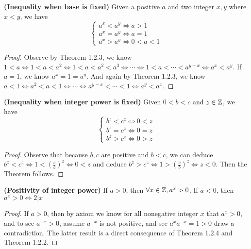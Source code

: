 \documentclass{report}
\begin{document}
\begin{theorem}
\textbf{(Inequality when base is fixed)} Given a positive $a$ and two integer  $x,y$ where  $x<y$, we have
\begin{equation}
\begin{cases}
  a^x<a^y\iff a>1\\
  a^x=a^y \iff a=1 \\
  a^x>a^y \iff 0<a<1  
\end{cases}
\end{equation}
\end{theorem}
\begin{proof}
Observe by Theorem 1.2.3, we know $1<a\iff  1<a<a^2\iff   1<a<a^2<a^3\iff  \cdots  \iff  1<a<\cdots <a^{y-x}\iff  a^x<a^y$. If $a=1$, we know  $a^x=1=a^y$. And again by Theorem 1.2.3, we know $a<1\iff  a^2<a<1\iff  \cdots \iff  a^{y-x}<\cdots <1\iff  a^{y}<a^{x}$. 
\end{proof}
\begin{theorem}
\textbf{(Inequality when integer power is fixed)} Given $0<b<c$ and  $z\in\mathbb{Z}$, we have 
\begin{equation}
\begin{cases}
  b^z<c^z \iff 0<z\\
  b^z=c^z \iff 0=z\\
  b^z>c^z\iff 0>z
\end{cases}
\end{equation}
\end{theorem}
\begin{proof}
Observe that because $b,c$ are positive and  $b<c$, we can deduce $b^z<c^z\iff 1<(\frac{c}{b})^z \iff 0<z$ and deduce $b^z>c^z\iff 1>(\frac{c}{b})^z\iff z<0$. Then the Theorem follows.
\end{proof}
\begin{theorem}
\textbf{(Positivity of integer power)} If $a>0$, then $\forall x\in\mathbb{Z},a^x>0$. If  $a<0$, then  $a^x>0\iff 2|x$
\end{theorem}
\begin{proof}
If $a>0$, then by axiom we know for all nonegative integer  $x$ that  $a^x>0$, and to see  $a^{-x}>0$, assume $a^{-x}$ is not positive, and see $a^xa^{-x}=1>0$ draw a contradiction. The latter result is a direct consequence of Theorem 1.2.4 and Theorem 1.2.2.  
\end{proof}
\end{document}
